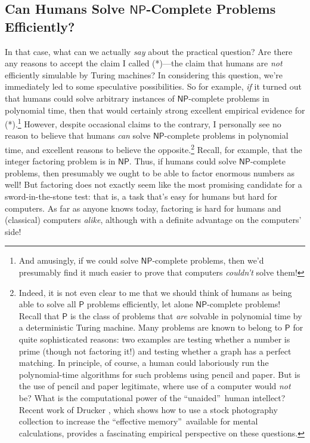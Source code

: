 \documentclass[12pt,onecolumn]{article}%
\begin{document}
\subsection{Can Humans Solve $\mathsf{NP}$-Complete Problems
Efficiently?\label{HUMANS}}

In that case, what can we actually \textit{say} about the practical question?
 Are there any reasons to accept the claim I called (*)---the claim that
humans are \textit{not} efficiently simulable by Turing machines? In
considering this question, we're immediately led to some speculative
possibilities. So for example, \textit{if} it turned out that humans could
solve arbitrary instances of $\mathsf{NP}$-complete problems in polynomial
time, then that would certainly strong excellent empirical evidence for
(*).\footnote{And amusingly, if we could solve $\mathsf{NP}$-complete
problems, then we'd presumably find it much easier to prove that computers
\textit{couldn't} solve them!} However, despite occasional claims to the
contrary, I personally see no reason to believe that humans \textit{can} solve
$\mathsf{NP}$-complete problems in polynomial time, and excellent reasons to
believe the opposite.\footnote{Indeed, it is not even clear to me that we
should think of humans as being able to solve all $\mathsf{P}$ problems
efficiently, let alone $\mathsf{NP}$-complete problems! Recall that
$\mathsf{P}$ is the class of problems that \textit{are} solvable in
polynomial time by a deterministic Turing machine. Many problems are known
to belong to $\mathsf{P}$ for quite sophisticated reasons: two examples are
testing whether a number is prime (though not factoring it!) \cite{aks} and
testing whether a graph has a perfect matching. In principle, of course, a
human could laboriously run the polynomial-time algorithms for such problems
using pencil and paper. But is the use of pencil and paper legitimate, where
use of a computer would \textit{not} be? What is the computational power of
the \textquotedblleft unaided\textquotedblright\  human intellect? Recent
work of Drucker \cite{drucker}, which shows how to use a stock photography
collection to increase the \textquotedblleft effective
memory\textquotedblright\  available for mental calculations, provides a
fascinating empirical perspective on these questions.} Recall, for example,
that the integer factoring problem is in $\mathsf{NP}$. Thus, if humans
could solve $\mathsf{NP}$-complete problems, then presumably we ought to be
able to factor enormous numbers as well! But factoring does not exactly seem
like the most promising candidate for a sword-in-the-stone test: that is, a
task that's easy for humans but hard for computers. As far as anyone knows
today, factoring is hard for humans and (classical) computers\textit{ alike},
although with a definite advantage on the computers' side!
\end{document}
